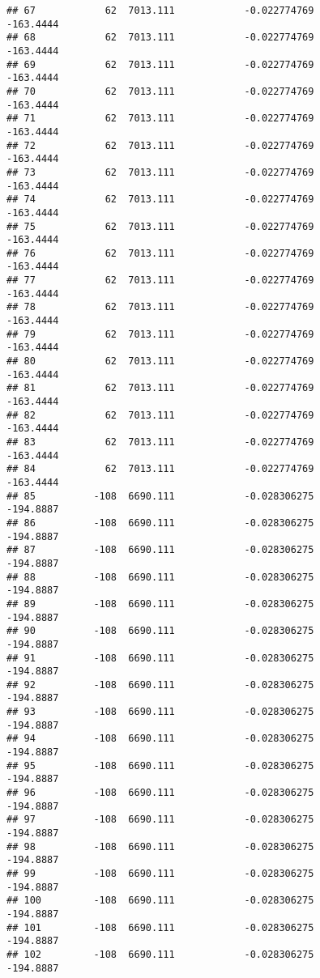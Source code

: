 \documentclass[]{article}
\begin{document}
\begin{verbatim}
## 67            62  7013.111            -0.022774769          -163.4444
## 68            62  7013.111            -0.022774769          -163.4444
## 69            62  7013.111            -0.022774769          -163.4444
## 70            62  7013.111            -0.022774769          -163.4444
## 71            62  7013.111            -0.022774769          -163.4444
## 72            62  7013.111            -0.022774769          -163.4444
## 73            62  7013.111            -0.022774769          -163.4444
## 74            62  7013.111            -0.022774769          -163.4444
## 75            62  7013.111            -0.022774769          -163.4444
## 76            62  7013.111            -0.022774769          -163.4444
## 77            62  7013.111            -0.022774769          -163.4444
## 78            62  7013.111            -0.022774769          -163.4444
## 79            62  7013.111            -0.022774769          -163.4444
## 80            62  7013.111            -0.022774769          -163.4444
## 81            62  7013.111            -0.022774769          -163.4444
## 82            62  7013.111            -0.022774769          -163.4444
## 83            62  7013.111            -0.022774769          -163.4444
## 84            62  7013.111            -0.022774769          -163.4444
## 85          -108  6690.111            -0.028306275          -194.8887
## 86          -108  6690.111            -0.028306275          -194.8887
## 87          -108  6690.111            -0.028306275          -194.8887
## 88          -108  6690.111            -0.028306275          -194.8887
## 89          -108  6690.111            -0.028306275          -194.8887
## 90          -108  6690.111            -0.028306275          -194.8887
## 91          -108  6690.111            -0.028306275          -194.8887
## 92          -108  6690.111            -0.028306275          -194.8887
## 93          -108  6690.111            -0.028306275          -194.8887
## 94          -108  6690.111            -0.028306275          -194.8887
## 95          -108  6690.111            -0.028306275          -194.8887
## 96          -108  6690.111            -0.028306275          -194.8887
## 97          -108  6690.111            -0.028306275          -194.8887
## 98          -108  6690.111            -0.028306275          -194.8887
## 99          -108  6690.111            -0.028306275          -194.8887
## 100         -108  6690.111            -0.028306275          -194.8887
## 101         -108  6690.111            -0.028306275          -194.8887
## 102         -108  6690.111            -0.028306275          -194.8887

\end{verbatim}
\end{document}
